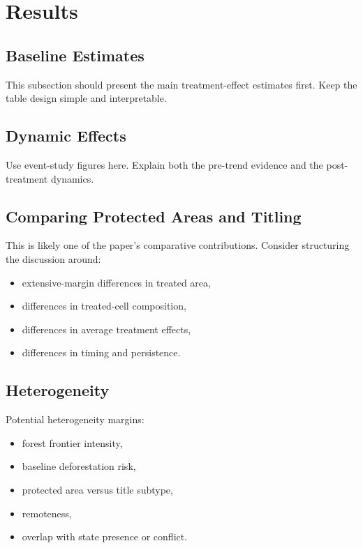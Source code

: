 \section{Results}

\subsection{Baseline Estimates}

This subsection should present the main treatment-effect estimates first. Keep the table design simple and interpretable.

\subsection{Dynamic Effects}

Use event-study figures here. Explain both the pre-trend evidence and the post-treatment dynamics.

\subsection{Comparing Protected Areas and Titling}

This is likely one of the paper's comparative contributions. Consider structuring the discussion around:

\begin{itemize}
    \item extensive-margin differences in treated area,
    \item differences in treated-cell composition,
    \item differences in average treatment effects,
    \item differences in timing and persistence.
\end{itemize}

\subsection{Heterogeneity}

Potential heterogeneity margins:

\begin{itemize}
    \item forest frontier intensity,
    \item baseline deforestation risk,
    \item protected area versus title subtype,
    \item remoteness,
    \item overlap with state presence or conflict.
\end{itemize}
